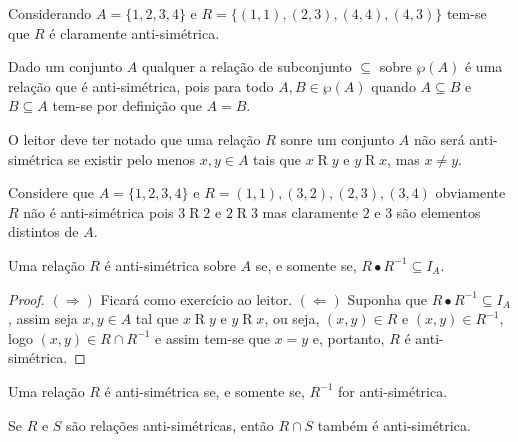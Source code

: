 \begin{example}
	Considerando $A = \{1,2,3,4\}$ e $R = \{(1,1), (2,3), (4,4), (4,3)\}$ tem-se que $R$ é claramente anti-simétrica.
\end{example}

\begin{example}
	Dado um conjunto $A$ qualquer a relação de subconjunto $\subseteq$ sobre $\wp(A)$ é uma relação que é anti-simétrica, pois para todo $A, B \in \wp(A)$ quando $A \subseteq B$ e $B \subseteq A$ tem-se por definição que $A = B$.
\end{example}

O leitor deve ter notado que uma relação $R$ sonre um conjunto $A$ não será anti-simétrica se existir pelo menos $x,y \in A$ tais que $x \mathrel{R} y$ e $y \mathrel{R} x$, mas $x \neq y$. 

\begin{example}
	Considere que $A = \{1,2,3,4\}$ e $R = {(1,1), (3,2), (2,3), (3,4)}$ obviamente $R$ não é anti-simétrica pois $3 \mathrel{R} 2$ e $2 \mathrel{R} 3$ mas claramente $2$ e $3$ são elementos distintos de $A$. 
\end{example}

\begin{theorem}\label{teo:CaracterizacaoRelacaoAntiSimetricas}
	Uma relação $R$ é anti-simétrica sobre $A$ se, e somente se, $R \bullet R^{-1} \subseteq I_A$.
\end{theorem}

\begin{proof}
	$(\Rightarrow)$ Ficará como exercício ao leitor. $(\Leftarrow)$ Suponha que $R \bullet R^{-1} \subseteq I_A$, assim seja $x, y \in A$ tal que $x \mathrel{R} y$ e $y \mathrel{R} x$, ou seja, $(x, y) \in R$ e $(x, y) \in R^{-1}$, logo $(x, y) \in R \cap R^{-1}$ e assim tem-se que $x = y$ e, portanto, $R$ é anti-simétrica.
\end{proof}

\begin{corollary}
	Uma relação $R$ é anti-simétrica se, e somente se, $R^{-1}$ for anti-simétrica.
\end{corollary}

\begin{theorem}
	Se $R$ e $S$ são relações anti-simétricas, então $R \cap S$ também é anti-simétrica.
\end{theorem}

